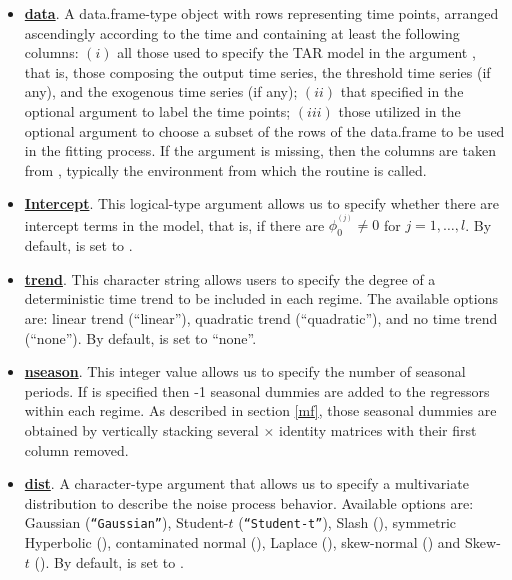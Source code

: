 \begin{itemize}
\item \underline{\bf data}. A data.frame-type object with rows representing time points, arranged ascendingly according to the time and containing at least the following columns: $(i)$ all those used to specify the TAR model in the argument , that is, those composing the output time series, the threshold time series (if any), and the exogenous time series (if any); $(ii)$ that specified in the optional argument  to label the time points; $(iii)$ those utilized in the optional argument  to choose a subset of the rows of the data.frame to be used in the fitting process. If the argument  is missing, then the columns are taken from , typically the environment from which the routine  is called.

\item \underline{\bf Intercept}. This logical-type argument allows us to specify whether there are intercept terms in the model, that is, if there are $\phi_0^{^{(j)}}\neq 0$ for $j=1,\ldots,l$. By default,  is set to .

\item \underline{\bf trend}. This character string allows users to specify the degree of a deterministic time trend to be included in each regime. The available options are: linear trend (``linear''), quadratic trend (``quadratic''), and no time trend (``none''). By default,  is set to ``none''.

\item \underline{\bf nseason}. This integer value allows us to specify the number of seasonal periods. If  is specified then -1 seasonal dummies are added to the regressors within each regime. As described in section \ref{mf}, those seasonal dummies are obtained by vertically stacking several $\times$  identity matrices with their first column removed.

\item \underline{\bf dist}. A character-type argument that allows us to specify a multivariate distribution to describe the noise process behavior. Available options are: Gaussian ({\tt``Gaussian''}), Student-$t$ ({\tt``Student-t''}), Slash (), symmetric Hyperbolic (), contaminated normal (), Laplace (), skew-normal () and Skew-$t$ (). By default,  is set to . 


\end{itemize}
